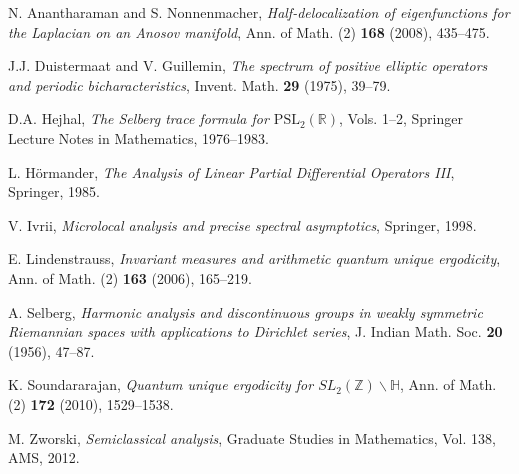 \begin{thebibliography}{99}

N. Anantharaman and S. Nonnenmacher, \emph{Half-delocalization of eigenfunctions for the Laplacian on an Anosov manifold}, Ann. of Math. (2) \textbf{168} (2008), 435–475.

J.J. Duistermaat and V. Guillemin, \emph{The spectrum of positive elliptic operators and periodic bicharacteristics}, Invent. Math. \textbf{29} (1975), 39–79.

D.A. Hejhal, \emph{The Selberg trace formula for $\mathrm{PSL}_2(\mathbb{R})$}, Vols. 1–2, Springer Lecture Notes in Mathematics, 1976–1983.

L. Hörmander, \emph{The Analysis of Linear Partial Differential Operators III}, Springer, 1985.

V. Ivrii, \emph{Microlocal analysis and precise spectral asymptotics}, Springer, 1998.

E. Lindenstrauss, \emph{Invariant measures and arithmetic quantum unique ergodicity}, Ann. of Math. (2) \textbf{163} (2006), 165–219.

A. Selberg, \emph{Harmonic analysis and discontinuous groups in weakly symmetric Riemannian spaces with applications to Dirichlet series}, J. Indian Math. Soc. \textbf{20} (1956), 47–87.

K. Soundararajan, \emph{Quantum unique ergodicity for $SL_2(\mathbb{Z}) \backslash \mathbb{H}$}, Ann. of Math. (2) \textbf{172} (2010), 1529–1538.

M. Zworski, \emph{Semiclassical analysis}, Graduate Studies in Mathematics, Vol. 138, AMS, 2012.

\end{thebibliography}

